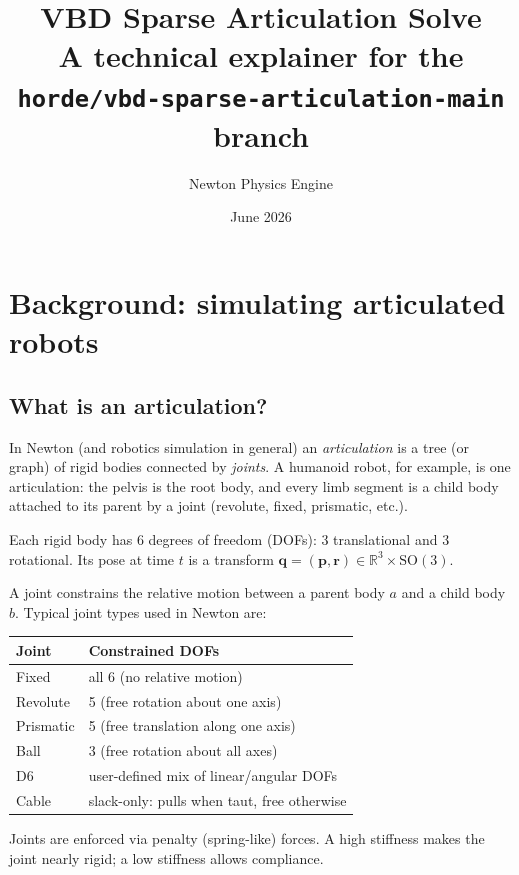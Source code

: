 \documentclass[11pt,a4paper]{article}
\title{\textbf{VBD Sparse Articulation Solve} \\
  \large A technical explainer for the \texttt{horde/vbd-sparse-articulation-main} branch}
\author{Newton Physics Engine}
\date{June 2026}
\begin{document}
\maketitle
\tableofcontents
\newpage

\section{Background: simulating articulated robots}

\subsection{What is an articulation?}

In Newton (and robotics simulation in general) an \emph{articulation} is a
tree (or graph) of rigid bodies connected by \emph{joints}.  A humanoid robot,
for example, is one articulation: the pelvis is the root body, and every limb
segment is a child body attached to its parent by a joint (revolute, fixed,
prismatic, etc.).

Each rigid body has 6 degrees of freedom (DOFs): 3 translational and 3
rotational.  Its pose at time $t$ is a transform $\mathbf{q} = (\mathbf{p},
\mathbf{r}) \in \mathbb{R}^3 \times \mathrm{SO}(3)$.

A joint constrains the relative motion between a parent body $a$ and a child
body $b$.  Typical joint types used in Newton are:

\begin{center}
\begin{tabular}{ll}
\toprule
Joint & Constrained DOFs \\
\midrule
Fixed      & all 6 (no relative motion) \\
Revolute   & 5 (free rotation about one axis) \\
Prismatic  & 5 (free translation along one axis) \\
Ball       & 3 (free rotation about all axes) \\
D6         & user-defined mix of linear/angular DOFs \\
Cable      & slack-only: pulls when taut, free otherwise \\
\bottomrule
\end{tabular}
\end{center}

Joints are enforced via penalty (spring-like) forces.  A high stiffness makes
the joint nearly rigid; a low stiffness allows compliance.
\end{document}
